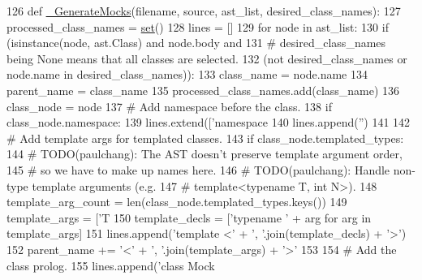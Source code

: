 \begin{DoxyCode}
126 \textcolor{keyword}{def }\hyperlink{namespacecpp_1_1gmock__class_a3f8d5ceabb0bd6143422efeccc900ca9}{\_GenerateMocks}(filename, source, ast\_list, desired\_class\_names):
127   processed\_class\_names = \hyperlink{namespacecpp_1_1gmock__class_a2157e96eee0b4bf9ca6d195ab76f59c2}{set}()
128   lines = []
129   \textcolor{keywordflow}{for} node \textcolor{keywordflow}{in} ast\_list:
130     \textcolor{keywordflow}{if} (isinstance(node, ast.Class) \textcolor{keywordflow}{and} node.body \textcolor{keywordflow}{and}
131         \textcolor{comment}{# desired\_class\_names being None means that all classes are selected.}
132         (\textcolor{keywordflow}{not} desired\_class\_names \textcolor{keywordflow}{or} node.name \textcolor{keywordflow}{in} desired\_class\_names)):
133       class\_name = node.name
134       parent\_name = class\_name
135       processed\_class\_names.add(class\_name)
136       class\_node = node
137       \textcolor{comment}{# Add namespace before the class.}
138       \textcolor{keywordflow}{if} class\_node.namespace:
139         lines.extend([\textcolor{stringliteral}{'namespace %
140         lines.append(\textcolor{stringliteral}{''})
141 
142       \textcolor{comment}{# Add template args for templated classes.}
143       \textcolor{keywordflow}{if} class\_node.templated\_types:
144         \textcolor{comment}{# TODO(paulchang): The AST doesn't preserve template argument order,}
145         \textcolor{comment}{# so we have to make up names here.}
146         \textcolor{comment}{# TODO(paulchang): Handle non-type template arguments (e.g.}
147         \textcolor{comment}{# template<typename T, int N>).}
148         template\_arg\_count = len(class\_node.templated\_types.keys())
149         template\_args = [\textcolor{stringliteral}{'T%
150         template\_decls = [\textcolor{stringliteral}{'typename '} + arg \textcolor{keywordflow}{for} arg \textcolor{keywordflow}{in} template\_args]
151         lines.append(\textcolor{stringliteral}{'template <'} + \textcolor{stringliteral}{', '}.join(template\_decls) + \textcolor{stringliteral}{'>'})
152         parent\_name += \textcolor{stringliteral}{'<'} + \textcolor{stringliteral}{', '}.join(template\_args) + \textcolor{stringliteral}{'>'}
153 
154       \textcolor{comment}{# Add the class prolog.}
155       lines.append(\textcolor{stringliteral}{'class Mock%
}}}
\end{DoxyCode}
